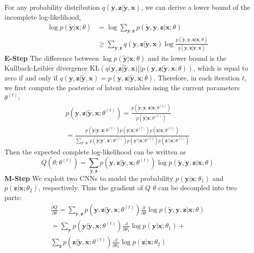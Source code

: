 \documentclass[10pt,twocolumn,letterpaper]{article}
\def\vec{\mathbf}
\begin{document}
For any probability distribution $q(\vec{y}, \vec{z} | \tilde{\vec{y}}, \vec{x})$, we can derive a lower bound of the incomplete log-likelihood,
\begin{equation}
\begin{aligned}
    \log p(\tilde{\vec{y}} | \vec{x}; \theta) &= \log \sum_{\vec{y},\vec{z}} p(\tilde{\vec{y}}, \vec{y}, \vec{z} | \vec{x}; \theta) \\
    &\geq \sum_{\vec{y},\vec{z}} q(\vec{y}, \vec{z} | \tilde{\vec{y}}, \vec{x}) \log \frac{p(\tilde{\vec{y}}, \vec{y}, \vec{z} | \vec{x}; \theta)}{q(\vec{y}, \vec{z} | \tilde{\vec{y}}, \vec{x})}
\end{aligned}
\end{equation}
\textbf{E-Step} The difference between $\log p(\tilde{\vec{y}} | \vec{x}; \theta)$ and its lower bound is the Kullback-Leibler divergence $\mathrm{KL}\left(q(\vec{y}, \vec{z} | \tilde{\vec{y}}, \vec{x}) || p(\vec{y}, \vec{z} | \tilde{\vec{y}}, \vec{x}; \theta)\right)$, which is equal to zero if and only if $q(\vec{y}, \vec{z} | \tilde{\vec{y}}, \vec{x}) = p(\vec{y}, \vec{z} | \tilde{\vec{y}}, \vec{x}; \theta)$. Therefore, in each iteration $t$, we first compute the posterior of latent variables using the current parameters $\theta^{(t)}$:
\begin{multline} \label{eq:posterior}
    p(\vec{y}, \vec{z} | \tilde{\vec{y}}, \vec{x}; \theta^{(t)}) = \frac{p(\tilde{\vec{y}}, \vec{y}, \vec{z} | \vec{x}; \theta^{(t)})}{p(\tilde{\vec{y}} | \vec{x}; \theta^{(t)})} \\
    = \frac{p(\tilde{\vec{y}}|\vec{y},\vec{z};\theta^{(t)}) p(\vec{y}|\vec{x};\theta^{(t)}) p(\vec{z}|\vec{x};\theta^{(t)})}{\sum_{\vec{y}',\vec{z}'} p(\tilde{\vec{y}}|\vec{y}',\vec{z}';\theta^{(t)}) p(\vec{y}'|\vec{x};\theta^{(t)}) p(\vec{z}'|\vec{x};\theta^{(t)})}
\end{multline}
Then the expected complete log-likelihood can be written as
\begin{equation}
    Q(\theta; \theta^{(t)}) = \sum_{\vec{y},\vec{z}} p(\vec{y}, \vec{z} | \tilde{\vec{y}}, \vec{x}; \theta^{(t)}) \log p(\tilde{\vec{y}}, \vec{y}, \vec{z} | \vec{x}; \theta)
\end{equation}
\textbf{M-Step} We exploit two CNNs to model the probability $p(\vec{y}|\vec{x};\theta_1)$ and $p(\vec{z}|\vec{x};\theta_2)$, respectively. Thus the gradient of $Q$ \wrt $\theta$ can be decoupled into two parts:
\begin{multline} \label{eq:gradient}
    \frac{\partial Q}{\partial \theta} = \sum_{\vec{y},\vec{z}} p(\vec{y}, \vec{z} | \tilde{\vec{y}}, \vec{x}; \theta^{(t)}) \frac{\partial}{\partial \theta} \log p(\tilde{\vec{y}}, \vec{y}, \vec{z} | \vec{x}; \theta) \\
    = \sum_{\vec{y}} p(\vec{y} | \tilde{\vec{y}}, \vec{x}; \theta^{(t)}) \frac{\partial}{\partial \theta_1} \log p(\vec{y}|\vec{x};\theta_1) + \\
      \sum_{\vec{z}} p(\vec{z} | \tilde{\vec{y}}, \vec{x}; \theta^{(t)}) \frac{\partial}{\partial \theta_2} \log p(\vec{z}|\vec{x};\theta_2)
\end{multline}
\end{document}

